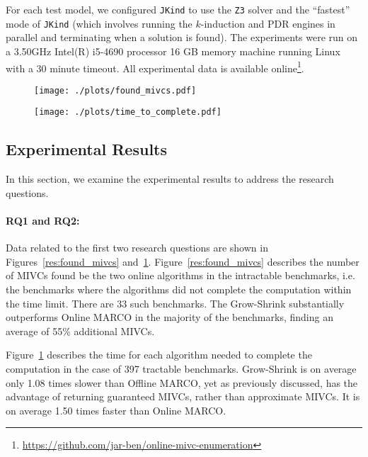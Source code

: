 For each test model, we configured \texttt{JKind} to use the \texttt{Z3} solver and the ``fastest'' mode of \texttt{JKind} (which involves running the $k$-induction and PDR engines in parallel and terminating when a solution is found). The experiments were run on a  3.50GHz  Intel(R) i5-4690 processor 16 GB memory machine running Linux with a 30 minute timeout.  All experimental data is available online\footnote{\url{https://github.com/jar-ben/online-mivc-enumeration}}.




\begin{figure}[!t]
\centering
\begin{minipage}{.4\textwidth}
\centering
\texttt{[image: ./plots/found\_mivcs.pdf]}%
%
\label{res:found_mivcs}
\end{minipage}\hfill
\begin{minipage}{.52\textwidth}
\centering
\texttt{[image: ./plots/time\_to\_complete.pdf]}%
%
\label{res:time_to_complete}
\end{minipage}
\end{figure}



\subsection{Experimental Results}
In this section, we examine the experimental results to address the research questions.

\paragraph{RQ1 and RQ2:}
Data related to the first two research questions are shown in Figures~\ref{res:found_mivcs} and~\ref{res:time_to_complete}.
Figure~\ref{res:found_mivcs} describes the number of MIVCs found be the two online algorithms in the intractable benchmarks, i.e. the benchmarks where the algorithms did not complete the computation within the time limit. There are 33 such benchmarks. The Grow-Shrink substantially outperforms Online MARCO in the majority of the benchmarks, finding an average of 55\% additional MIVCs.

Figure~\ref{res:time_to_complete} describes the time for each algorithm needed to complete the computation in the case of 397 tractable benchmarks.
Grow-Shrink is on average only 1.08 times slower than Offline MARCO,
yet as previously discussed, has the advantage of returning guaranteed MIVCs, rather than approximate MIVCs. It is on average 1.50 times faster than Online MARCO.


